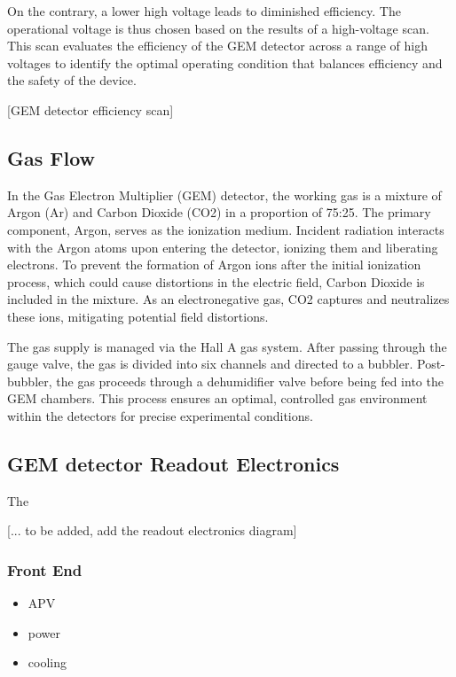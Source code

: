 On the contrary, a lower high voltage leads to diminished efficiency. The operational voltage is thus chosen based on the results of a high-voltage scan. This scan evaluates the efficiency of the GEM detector across a range of high voltages to identify the optimal operating condition that balances efficiency and the safety of the device.

[GEM detector efficiency scan]

\subsection{Gas Flow}

In the Gas Electron Multiplier (GEM) detector, the working gas is a mixture of Argon (Ar) and Carbon Dioxide (CO2) in a proportion of 75:25. The primary component, Argon, serves as the ionization medium. Incident radiation interacts with the Argon atoms upon entering the detector, ionizing them and liberating electrons. To prevent the formation of Argon ions after the initial ionization process, which could cause distortions in the electric field, Carbon Dioxide is included in the mixture. As an electronegative gas, CO2 captures and neutralizes these ions, mitigating potential field distortions.

The gas supply is managed via the Hall A gas system. After passing through the gauge valve, the gas is divided into six channels and directed to a bubbler. Post-bubbler, the gas proceeds through a dehumidifier valve before being fed into the GEM chambers. This process ensures an optimal, controlled gas environment within the detectors for precise experimental conditions.

\subsection{GEM detector Readout Electronics}


The 

[... to be added, add the readout electronics diagram]

\subsubsection{Front End}

\begin{itemize}
    \item APV
    \item power 
    \item cooling
\end{itemize}

